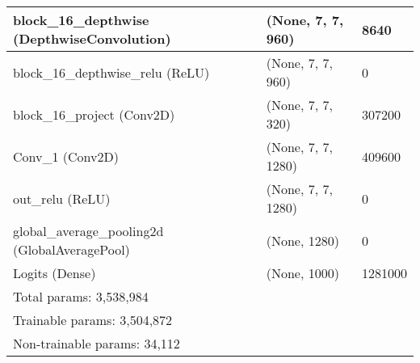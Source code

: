\documentclass{article}
\begin{document}
\begin{center}
\begin{longtable}[h]{ p{}  p{}  p{}}
block\_16\_depthwise (DepthwiseConvolution)        & (None, 7, 7, 960)    & 8640     \\ \hline
block\_16\_depthwise\_relu (ReLU)                  & (None, 7, 7, 960)    & 0        \\ \hline
block\_16\_project (Conv2D)                        & (None, 7, 7, 320)    & 307200   \\ \hline
Conv\_1 (Conv2D)                                   & (None, 7, 7, 1280)   & 409600   \\ \hline
out\_relu (ReLU)                                   & (None, 7, 7, 1280)   & 0        \\ \hline
global\_average\_pooling2d (GlobalAveragePool)     & (None, 1280)         & 0        \\ \hline
Logits (Dense)                                     & (None, 1000)         & 1281000  \\ \hline
Total params: 3,538,984                            &                      &          \\
Trainable params: 3,504,872                        &                      &          \\
Non-trainable params: 34,112                       &                      &         
\label{tab:MobileNetV2model}
\end{longtable}
\end{center}


\end{document}
